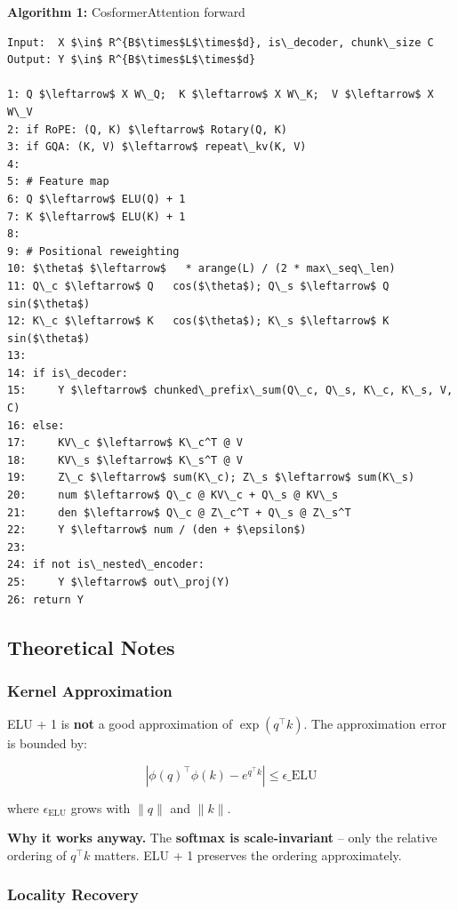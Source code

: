 \textbf{Algorithm 1:} CosformerAttention forward
\begin{lstlisting}
Input:  X $\in$ R^{B$\times$L$\times$d}, is\_decoder, chunk\_size C
Output: Y $\in$ R^{B$\times$L$\times$d}

1: Q $\leftarrow$ X W\_Q;  K $\leftarrow$ X W\_K;  V $\leftarrow$ X W\_V
2: if RoPE: (Q, K) $\leftarrow$ Rotary(Q, K)
3: if GQA: (K, V) $\leftarrow$ repeat\_kv(K, V)
4:
5: # Feature map
6: Q $\leftarrow$ ELU(Q) + 1
7: K $\leftarrow$ ELU(K) + 1
8:
9: # Positional reweighting
10: $\theta$ $\leftarrow$   * arange(L) / (2 * max\_seq\_len)
11: Q\_c $\leftarrow$ Q   cos($\theta$); Q\_s $\leftarrow$ Q   sin($\theta$)
12: K\_c $\leftarrow$ K   cos($\theta$); K\_s $\leftarrow$ K   sin($\theta$)
13:
14: if is\_decoder:
15:     Y $\leftarrow$ chunked\_prefix\_sum(Q\_c, Q\_s, K\_c, K\_s, V, C)
16: else:
17:     KV\_c $\leftarrow$ K\_c^T @ V
18:     KV\_s $\leftarrow$ K\_s^T @ V
19:     Z\_c $\leftarrow$ sum(K\_c); Z\_s $\leftarrow$ sum(K\_s)
20:     num $\leftarrow$ Q\_c @ KV\_c + Q\_s @ KV\_s
21:     den $\leftarrow$ Q\_c @ Z\_c^T + Q\_s @ Z\_s^T
22:     Y $\leftarrow$ num / (den + $\epsilon$)
23:
24: if not is\_nested\_encoder:
25:     Y $\leftarrow$ out\_proj(Y)
26: return Y
\end{lstlisting}

\subsection{Theoretical Notes}

\subsubsection{Kernel Approximation}

ELU + 1 is \textbf{not} a good approximation of $\exp(q^\top k)$. The 
approximation error is bounded by:

\[
\left|\phi(q)^\top \phi(k) - e^{q^\top k}\right| \leq \epsilon\_\text{ELU}
\]

where $\epsilon_\text{ELU}$ grows with $\|q\|$ and $\|k\|$.

\textbf{Why it works anyway.} The \textbf{softmax is scale-invariant} -- only the 
relative ordering of $q^\top k$ matters. ELU + 1 preserves the ordering 
approximately.

\subsubsection{Locality Recovery}

